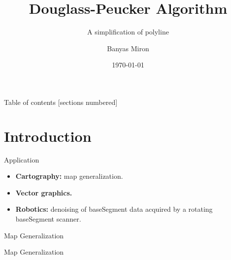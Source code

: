 \documentclass[10pt]{beamer}
\title{Douglass-Peucker Algorithm}
\subtitle{A simplification of polyline}
\date{\today}
\author{Banyas Miron}
\institute{Kyiv Algorithms Club}
\begin{document}
\maketitle

\begin{frame}{Table of contents}
  [sections numbered]
  \tableofcontents[hideallsubsections]
\end{frame}

\section{Introduction}

\begin{frame}{Application}
	\begin{itemize}
		\item \textbf{Cartography:} map generalization.
		\item \textbf{Vector graphics.}
		\item \textbf{Robotics:} denoising of baseSegment data acquired by a rotating baseSegment scanner.
	\end{itemize}
\end{frame}

\begin{frame}{Map Generalization}
	\begin{figure}[h]
		\end{figure}
\end{frame}

\begin{frame}{Map Generalization}
	\begin{figure}[h]
		\end{figure}
\end{frame}
\end{document}
